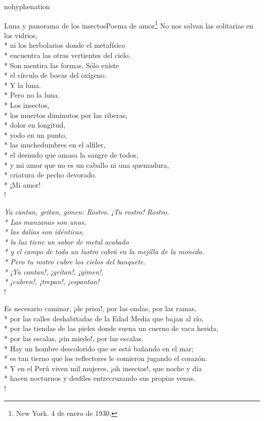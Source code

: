 \documentclass[
    a5paper,
    DIV=10,
    12pt,
    notitlepage,
    oneside,]
{scrbook} %
\begin{document}
\begin{hyphenrules}{nohyphenation}
\begin{poem}{Luna y panorama de los insectos}{Poema de amor\footnote{New York. 4 de enero de 1930.}}{}
No nos salvan las solitarias en los vidrios,\\*
ni los herbolarios donde el metafísico\\*
encuentra las otras vertientes del cielo.\\*
Son mentira las formas. Sólo existe\\*
el círculo de bocas del oxígeno.\\*
Y la luna.\\*
Pero no la luna.\\*
Los insectos,\\*
los muertos diminutos por las riberas,\\*
dolor en longitud,\\*
yodo en un punto,\\*
las muchedumbres en el alfiler,\\*
el desnudo que amasa la sangre de todos,\\*
y mi amor que no es un caballo ni una quemadura,\\*
criatura de pecho devorado.\\*
¡Mi amor! \\!

\emph{Ya cantan, gritan, gimen: Rostro. ¡Tu rostro! Rostro.\\*
Las manzanas son unas,\\*
las dalias son idénticas,\\*
la luz tiene un sabor de metal acabado\\*
y el campo de todo un lustro cabrá en la mejilla de la moneda.\\*
Pero tu rostro cubre los cielos del banquete.\\*
¡Ya cantan!, ¡gritan!, ¡gimen!,\\*
¡cubren!, ¡trepan!, ¡espantan!} \\!

Es necesario caminar, ¡de prisa!, por las ondas, por las ramas,\\*
por las calles deshabitadas de la Edad Media que bajan al río,\\*
por las tiendas de las pieles donde suena un cuerno de vaca herida,\\*
por las escalas, ¡sin miedo!, por las escalas.\\*
Hay un hombre descolorido que se está bañando en el mar;\\*
es tan tierno que los reflectores le comieron jugando el corazón.\\*
Y en el Perú viven mil mujeres, ¡oh insectos!, que noche y día\\*
hacen nocturnos y desfiles entrecruzando sus propias venas.\\!


\end{poem}
\end{hyphenrules}
\end{document}
